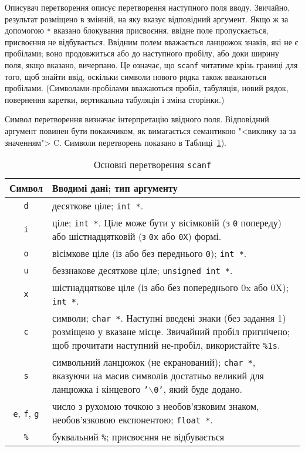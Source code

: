 \documentclass[a4paper,12pt]{book}
\newcommand{\head}[1]{\textnormal{\textbf{#1}}}
\begin{document}
  Описувач перетворення описує перетворення наступного поля вводу. Звичайно, результат
  розміщено в змінній, на яку вказує відповідний аргумент. Якщо ж за допомогою \texttt{*}
  вказано блокування присвоєння, ввідне поле пропускається, присвоєння не відбувається.
  Ввідним полем вважається ланцюжок знаків, які не є пробілами; воно продовжиться
  або до наступного пробілу, або доки ширину поля, якщо вказано, вичерпано. Це означає, що
  \texttt{scanf} читатиме крізь границі для того, щоб знайти ввід, оскільки символи нового
  рядка також вважаються пробілами. (Символами-пробілами вважаються пробіл, табуляція,
  новий рядок, повернення каретки, вертикальна табуляція і зміна сторінки.)

  Символ перетворення визначає інтерпретацію ввідного поля. Відповідний аргумент повинен
  бути покажчиком, як вимагається семантикою "<виклику за за значенням"> C.
  Символи перетворень показано в Таблиці~\ref{f0:T7.2}).

  \begin{table}[!h]
  \caption{Основні перетворення \texttt{scanf}}
  \label{f0:T7.2}
  \centering 
  \begin{tabular}{c|p{13cm}}
  \hline\hline
  \head{Символ} & \head{Вводимі дані; тип аргументу} \\
  \hline
  \texttt{d} & десяткове ціле; \texttt{int *}. \\
  \texttt{i} & ціле; \texttt{int *}. Ціле може бути у вісімковій (з
  \texttt{0} попереду) або шістнадцятковій (з \texttt{0x} або \texttt{0X}) формі. \\
  \texttt{o} & вісімкове ціле (із або без переднього \texttt{0}); \texttt{int *}. \\
  \texttt{u} & беззнакове десяткове ціле; \texttt{unsigned int *}. \\
  \texttt{x} & шістнадцяткове ціле (із або без попереднього 0x або 0X); \texttt{int *}. \\
  \texttt{c} & символи; \texttt{char *}. Наступні введені знаки (без задання 1) розміщено 
  у вказане місце. Звичайний пробіл пригнічено; щоб прочитати наступний не-пробіл,
  використайте \texttt{\%1s}. \\
  \texttt{s} & символьний ланцюжок (не екранований); \texttt{char *}, вказуючи на масив 
  символів достатньо великий для ланцюжка і кінцевого \texttt{'\mbox{$\backslash$}0'}, який 
  буде додано. \\
  \texttt{e}, \texttt{f}, \texttt{g} & число з рухомою точкою з необов'язковим знаком, 
  необов'язковою експонентою; \texttt{float *}. \\
  \texttt{\%} & буквальний \texttt{\%};  присвоєння не відбувається \\
  \hline
  \end{tabular}
  \end{table}
\end{document}

